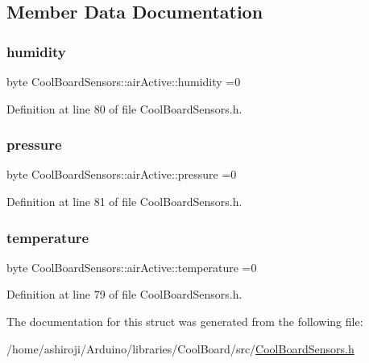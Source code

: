 \subsection{Member Data Documentation}
\mbox{\label{struct_cool_board_sensors_1_1air_active_ae5740445054b27415e22f450576accb7}} 
\subsubsection{\texorpdfstring{humidity}{humidity}}
{\footnotesize\ttfamily byte Cool\+Board\+Sensors\+::air\+Active\+::humidity =0}



Definition at line 80 of file Cool\+Board\+Sensors.\+h.

\mbox{\label{struct_cool_board_sensors_1_1air_active_ab200826a70d1dc9945f5efb6b9c732ed}} 
\subsubsection{\texorpdfstring{pressure}{pressure}}
{\footnotesize\ttfamily byte Cool\+Board\+Sensors\+::air\+Active\+::pressure =0}



Definition at line 81 of file Cool\+Board\+Sensors.\+h.

\mbox{\label{struct_cool_board_sensors_1_1air_active_a9a6633c426b0508e30ebc1832ec6d745}} 
\subsubsection{\texorpdfstring{temperature}{temperature}}
{\footnotesize\ttfamily byte Cool\+Board\+Sensors\+::air\+Active\+::temperature =0}



Definition at line 79 of file Cool\+Board\+Sensors.\+h.



The documentation for this struct was generated from the following file\+:\begin{DoxyCompactItemize}
\item 
/home/ashiroji/\+Arduino/libraries/\+Cool\+Board/src/\hyperlink{_cool_board_sensors_8h}{Cool\+Board\+Sensors.\+h}\end{DoxyCompactItemize}

